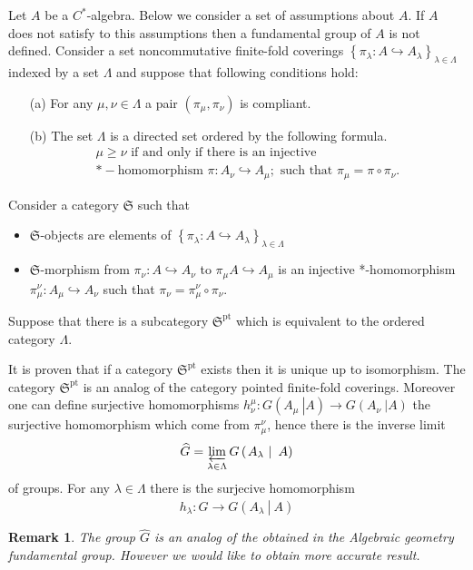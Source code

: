 \documentclass{beamer}
\theoremstyle{plain}
\newtheorem{rem}{Remark}
\newcommand{\be}{\begin{equation}}
\newcommand{\ee}{\end{equation}}
\newcommand{\la}{\lambda}
\newcommand{\La}{\Lambda}
\newcommand{\hookto}{\hookrightarrow}        %
\begin{document}
\begin{frame}
Let $A$ be a $C^*$-algebra. Below we consider a set of assumptions about $A$. If $A$ does not satisfy to this assumptions then a fundamental group of $A$ is not defined. Consider a set noncommutative finite-fold coverings $\left\{ \pi_{\la}:A \hookto A_{\la}\right\}_{\la \in \La}$ indexed by a set  $\La$ and suppose that  following conditions hold:
\begin{enumerate}
	\item[(a)] For any $\mu, \nu \in \La$ a pair $\left( \pi_\mu, \pi_\nu\right)$ is compliant.
	\item [(b)]
The set	$\La$ is a directed set ordered by the following formula.
	\be\label{fg_ord_eqn}
	\begin{split}
		\mu \ge \nu  \text{ if and only if there is an injective}\\ *-\text{homomorphism } \pi: A_\nu \hookto A_\mu; 
		\text{ such that } \pi_\mu = \pi \circ \pi_\nu.
	\end{split}
	\ee
\end{enumerate}
Consider a category $\mathfrak{S}$ such that
\begin{itemize}
	\item $\mathfrak{S}$-objects are elements of $\left\{ \pi_{\la}:A \hookto A_{\la}\right\}_{\la \in \La}$
	\item $\mathfrak{S}$-morphism from $ \pi_\nu: A \hookto A_{\nu}$ to $ \pi_\mu A \hookto A_\mu$ is an injective *-homomorphism $\pi^\nu_\mu : A_\mu \hookto  A_\nu$ such that $\pi_\nu = \pi^{\nu}_\mu \circ \pi_\nu$. 
\end{itemize}
Suppose that there is a subcategory $\mathfrak{S}^{\text{pt}}$ which is equivalent to the ordered category $\La$.

\end{frame}
\begin{frame}
	It is proven that if a category $\mathfrak{S}^{\text{pt}}$ exists then it is unique up to isomorphism. The category $\mathfrak{S}^{\text{pt}}$ is an analog of the category pointed finite-fold coverings. Moreover  one can define surjective homomorphisms  $h^\mu_\nu:  G\left(\left.A_\mu~\right|A \right) \to  G\left(\left.A_\nu~\right|A \right)$ the surjective homomorphism which come from $\pi^\nu_\mu$, hence there is the inverse limit 
	$$
	\widehat{G}=	\varprojlim_{\la \in \La} G\left(\left.A_\la~\right|~A\right)
	$$
	of groups. For any $\la \in \La$ there is the surjecive homomorphism 
	\be\label{h_la_eqn}
	h_\la:\widehat{G}\to G\left(\left.A_\la~\right|~A\right)
	\ee
	\begin{rem}
	The group $\widehat{G}$ is an analog of the obtained in the Algebraic geometry fundamental group. However we would like to obtain more accurate result.
	\end{rem}
\end{frame}
\end{document}
